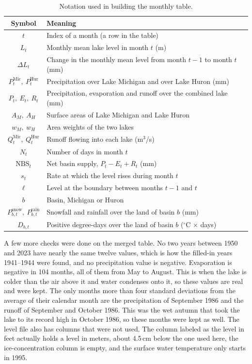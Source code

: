\documentclass{article}
\begin{document}
\begin{table}[htbp]
\centering
\caption{Notation used in building the monthly table.}
\label{tab:notation-data}
\begin{tabular}{||c|l||}
\hline\hline
Symbol & Meaning \\
\hline\hline
$t$ & Index of a month (a row in the table) \\
$L_t$ & Monthly mean lake level in month $t$ (m) \\
$\Delta L_t$ & Change in the monthly mean level from month $t-1$ to month $t$ (mm) \\
$P^{\mathrm{Mic}}_t,\ P^{\mathrm{Hur}}_t$ & Precipitation over Lake Michigan and over Lake Huron (mm) \\
$P_t,\ E_t,\ R_t$ & Precipitation, evaporation and runoff over the combined lake (mm) \\
$A_M,\ A_H$ & Surface areas of Lake Michigan and Lake Huron \\
$w_M,\ w_H$ & Area weights of the two lakes \\
$Q^{\mathrm{Mic}}_t,\ Q^{\mathrm{Hur}}_t$ & Runoff flowing into each lake (m$^3$/s) \\
$N_t$ & Number of days in month $t$ \\
$\mathrm{NBS}_t$ & Net basin supply, $P_t - E_t + R_t$ (mm) \\
$s_t$ & Rate at which the level rises during month $t$ \\
$\ell$ & Level at the boundary between months $t-1$ and $t$ \\
$b$ & Basin, Michigan or Huron \\
$P^{\mathrm{snow}}_{b,t},\ P^{\mathrm{rain}}_{b,t}$ & Snowfall and rainfall over the land of basin $b$ (mm) \\
$D_{b,t}$ & Positive degree-days over the land of basin $b$ ($^\circ$C $\times$ days) \\
\hline\hline
\end{tabular}
\end{table}

A few more checks were done on the merged table. No two years between 1950 and 2023 have nearly
the same twelve values, which is how the filled-in years 1941--1944 were found, and no
precipitation value is negative. Evaporation is negative in 104 months, all of them from May to
August. This is when the lake is colder than the air above it and water condenses onto it, so
these values are real and were kept. The only months more than four standard deviations from the
average of their calendar month are the precipitation of September 1986 and the runoff of
September and October 1986. This was the wet autumn that took the lake to its record high in
October 1986, so these months were kept as well. The level file also has columns that were not
used. The column labeled as the level in feet actually holds a level in meters, about 4.5\,cm
below the one used here, the ice-concentration column is empty, and the surface water
temperature only starts in 1995.
\end{document}

